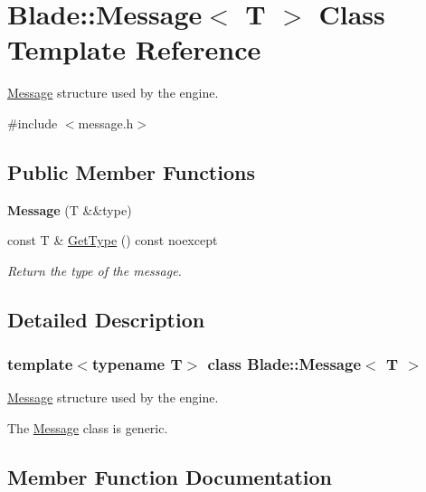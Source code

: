\hypertarget{class_blade_1_1_message}{}\section{Blade\+:\+:Message$<$ T $>$ Class Template Reference}
\label{class_blade_1_1_message}


\hyperlink{class_blade_1_1_message}{Message} structure used by the engine.  




{\ttfamily \#include $<$message.\+h$>$}

\subsection*{Public Member Functions}
\begin{DoxyCompactItemize}
\item 
\mbox{\label{class_blade_1_1_message_a8ffc93ea0c8ab92ce3fabc98d43ec9a1}} 
{\bfseries Message} (T \&\&type)
\item 
const T \& \hyperlink{class_blade_1_1_message_ab47922d6a73d5d01f8f740a926cef656}{Get\+Type} () const noexcept
\begin{DoxyCompactList}\small\item\em Return the type of the message. \end{DoxyCompactList}\end{DoxyCompactItemize}


\subsection{Detailed Description}
\subsubsection*{template$<$typename T$>$\newline
class Blade\+::\+Message$<$ T $>$}

\hyperlink{class_blade_1_1_message}{Message} structure used by the engine. 

The \hyperlink{class_blade_1_1_message}{Message} class is generic. 

\subsection{Member Function Documentation}
\mbox{\label{class_blade_1_1_message_ab47922d6a73d5d01f8f740a926cef656}} 
